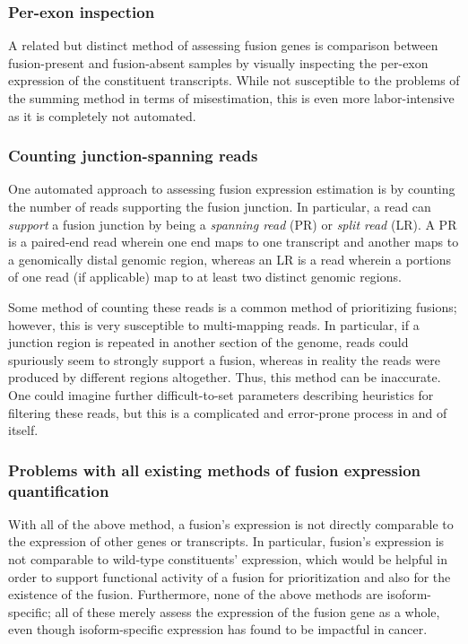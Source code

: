 \subsubsection{Per-exon inspection}

A related but distinct method of assessing fusion genes is comparison between fusion-present and fusion-absent samples by visually inspecting the per-exon expression of the constituent transcripts. While not susceptible to the problems of the summing method in terms of misestimation, this is even more labor-intensive as it is completely not automated.

\subsubsection{Counting junction-spanning reads}
One automated approach to assessing fusion expression estimation is by counting the number of reads supporting the fusion junction. In particular, a read can \textit{support} a fusion junction by being a \textit{spanning read} (PR) or \textit{split read} (LR). A PR is a paired-end read wherein one end maps to one transcript and another maps to a genomically distal genomic region, whereas an LR is a read wherein a portions of one read (if applicable) map to at least two distinct genomic regions.

Some method of counting these reads is a common method of prioritizing fusions; however, this is very susceptible to multi-mapping reads. In particular, if a junction region is repeated in another section of the genome, reads could spuriously seem to strongly support a fusion, whereas in reality the reads were produced by different regions altogether. Thus, this method can be inaccurate. One could imagine further difficult-to-set parameters describing heuristics for filtering these reads\cite{mcpherson_defuse:_2011}, but this is a complicated and error-prone process in and of itself.

\subsubsection{Problems with all existing methods of fusion expression quantification}

With all of the above method, a fusion's expression is not directly comparable to the expression of other genes or transcripts. In particular, fusion's expression is not comparable to wild-type constituents' expression, which would be helpful in order to support functional activity of a fusion for prioritization and also for the existence of the fusion. Furthermore, none of the above methods are isoform-specific; all of these merely assess the expression of the fusion gene as a whole, even though isoform-specific expression has found to be impactful in cancer\cite{christofk_m2_2008}\cite{hovanes_-cateninsensitive_2001}\cite{_insulin_2003}.


